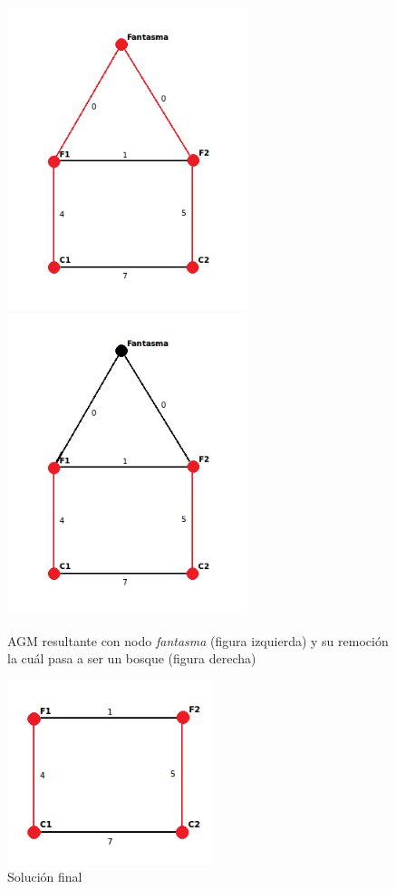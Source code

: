 \documentclass[a4paper, 10pt, twoside]{article}
\begin{document}
\begin{figure}[H]
\includegraphics[width=70mm]{../ejemplo_graficos/CosoDosSubconjuntosConNodoFantasmaSolucion.png}
\includegraphics[width=70mm]{../ejemplo_graficos/CosoDosSubconjuntosSolucionSinFantasma.png}
\caption{AGM resultante con nodo \textit{fantasma} (figura izquierda) y su remoción la cuál pasa a ser un bosque (figura derecha)}
\end{figure} 

\begin{figure}[H]
\centering
\includegraphics[width=60mm]{../ejemplo_graficos/CosoDosSubconjuntosSolucion.png}
\caption{Solución final}
\label{5}
\end{figure} 
\end{document}
